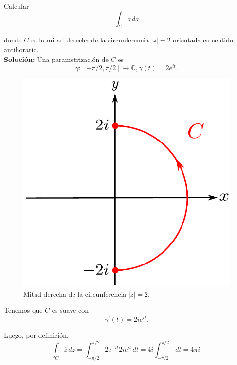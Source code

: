 \begin{ejemplo}
Calcular
$$\int_C \overline{z} \,dz$$

donde $C$ es la mitad derecha de la circunferencia $|z| = 2$ orientada en sentido antihorario.
\\

\textbf{Solución:} Una parametrización de $C$ es
$$\gamma: [- \pi/2, \pi/2] \longrightarrow \mathbb{C}, \gamma(t) = 2 e^{i t}.$$

\begin{figure}[H]
    \centering
    \includegraphics[scale = 0.5]{Figuras/Integral1.pdf}
    \caption{Mitad derecha de la circunferencia $|z| = 2$.}
    \label{fig:IntegralLinea1}
\end{figure}

\vspace{-0.4cm}

Tenemos que $C$ es suave con 
$$\gamma'(t) = 2 i e^{i t}.$$

Luego, por definición, 
\begin{equation*}
\int_C \overline{z} \,dz = \int_{- \pi/2}^{\pi/2} 2 e^{-it} 2 i e^{i t} \,dt = 4i \int_{-\pi/2}^{\pi/2}\, dt = 4 \pi i.
\end{equation*}
\end{ejemplo}

